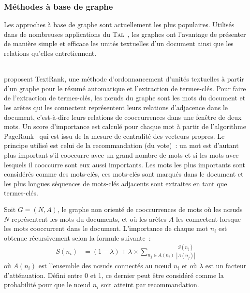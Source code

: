       \subsubsection{Méthodes à base de graphe}
      \label{subsubsec:main-state_of_the_art-automatic_keyphrase_extraction-unsupervised_keyphrase_extraction-graph_based_approaches}
        Les approches à base de graphe sont actuellement les plus populaires.
        Utilisés dans de nombreuses applications du
        \textsc{Tal}~\cite{kozareva2013textgraphs}, les graphes ont l'avantage
        de présenter de manière simple et efficace les unités textuelles d'un
        document ainsi que les relations qu'elles entretiennent.

        ~\\ proposent TextRank, une méthode
        d'ordonnancement d'unités textuelles à partir d'un graphe pour le résumé
        automatique et l'extraction de termes-clés. Pour faire de l'extraction
        de termes-clés, les n\oe{}uds du graphe sont les mots du document et les
        arêtes qui les connectent représentent leurs relations d'adjacence dans
        le document, c'est-à-dire leurs relations de cooccurrences dans une
        fenêtre de deux mots. Un score d'importance est calculé pour chaque mot
        à partir de l'algorithme PageRank~\cite{brin1998pagerank} qui est issu
        de la mesure de centralité des vecteurs propres. Le principe utilisé est
        celui de la recommandation (du vote)~: un mot est d'autant plus
        important s'il cooccurre avec un grand nombre de mots et si les mots
        avec lesquels il cooccurre sont eux aussi importants. Les mots les plus
        importants sont considérés comme des mots-clés, ces mots-clés sont
        marqués dans le document et les plus longues séquences de mots-clés
        adjacents sont extraites en tant que termes-clés.
      
        Soit $G = (N, A)$, le graphe non orienté de cooccurrences de mots où les
        n\oe{}uds $N$ représentent les mots du documents, et où les arêtes $A$
        les connectent lorsque les mots cooccurrent dans le document.
        L'importance de chaque mot $n_i$ est obtenue récursivement selon la
        formule suivante~:
        \begin{align}
          S(n_i) &= (1 - \lambda) + \lambda \times \sum_{n_j \in A(n_i)} \frac{S(n_j)}{|A(n_j)|} \label{math:textrank}
        \end{align}
        où $A(n_i)$ est l'ensemble des n\oe{}uds connectés au n\oe{}ud $n_i$ et
        où $\lambda$ est un facteur d'atténuation. Défini entre 0 et 1, ce
        dernier peut être considéré comme la probabilité pour que le n\oe{}ud
        $n_i$ soit atteint par recommandation.

